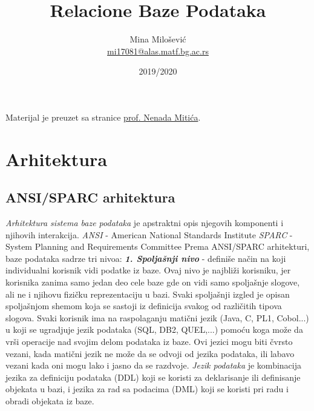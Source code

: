 \documentclass{article}
\title{Relacione Baze Podataka}
\author{Mina Milošević \\
\href{mailto:mi17081@alas.matf.bg.ac.rs}{mi17081@alas.matf.bg.ac.rs}}
\date{2019/2020}
\begin{document}
\maketitle

\vspace{10cm}
Materijal je preuzet sa stranice \href{http://poincare.matf.bg.ac.rs/~nenad/rbp.html}{prof. Nenada Mitića}.

\newpage

\renewcommand*\contentsname{Sadržaj}
\tableofcontents
\newpage

\section{Arhitektura}

\subsection{ANSI/SPARC arhitektura}
\textit{Arhitektura sistema baze podataka} je apstraktni opis njegovih
komponenti i njihovih interakcija. \newline
\textit{ANSI} - American National Standards Institute \newline
\textit{SPARC} - System Planning and Requirements Committee
\newline
Prema ANSI/SPARC arhitekturi, baze podataka sadrze tri nivoa:
\newline \hspace*{0.2cm}
\textbf{\textit{1. Spoljašnji nivo}} - definiše način na koji
individualni korisnik vidi podatke iz baze. Ovaj nivo je najbliži
korisniku, jer korisnika zanima samo jedan deo cele baze gde on vidi
samo spoljašnje slogove, ali ne i njihovu fizičku reprezentaciju u
bazi. Svaki spoljašnji izgled je opisan spoljašnjom shemom koja se
sastoji iz definicija svakog od različitih tipova
slogova. Svaki korisnik ima na raspolaganju matični jezik (Java, C, 
PL1, Cobol...) u koji se ugradjuje jezik podataka (SQL, DB2, QUEL,...)
pomoću
koga može da vrši operacije nad svojim delom podataka iz baze. Ovi
jezici mogu biti čvrsto vezani, kada matični jezik ne može da se odvoji
od jezika podataka, ili labavo vezani kada oni mogu lako i jasno da se
razdvoje. \newline
\textit{Jezik podataka} je kombinacija jezika za definiciju podataka
(DDL) koji se koristi za deklarisanje ili definisanje objekata u bazi,
i jezika za rad sa podacima (DML) koji se koristi pri radu i obradi
objekata iz baze. 
\newline \hspace*{0.2cm}
\end{document}
